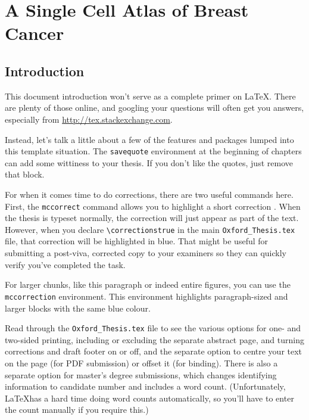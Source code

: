 \chapter{\label{ch:4}A Single Cell Atlas of Breast Cancer}

\minitoc

\section{Introduction}

This document introduction won't serve as a complete primer on \LaTeX.  There are plenty of those online, and googling your questions will often get you answers, especially from \url{http://tex.stackexchange.com}.

Instead, let's talk a little about a few of the features and packages lumped into this template situation.  The \verb|savequote| environment at the beginning of chapters can add some wittiness to your thesis.  If you don't like the quotes, just remove that block.

For when it comes time to do corrections, there are two useful commands here.  First, the \verb|mccorrect| command allows you to highlight a short correction .  When the thesis is typeset normally, the correction will just appear as part of the text.  However, when you declare \verb|\correctionstrue| in the main \verb|Oxford_Thesis.tex| file, that correction will be highlighted in blue.  That might be useful for submitting a post-viva, corrected copy to your examiners so they can quickly verify you've completed the task.

\begin{mccorrection}
For larger chunks, like this paragraph or indeed entire figures, you can use the \verb|mccorrection| environment.  This environment highlights paragraph-sized and larger blocks with the same blue colour.
\end{mccorrection}

Read through the \verb|Oxford_Thesis.tex| file to see the various options for one- and two-sided printing, including or excluding the separate abstract page, and turning corrections and draft footer on or off, and the separate option to centre your text on the page (for PDF submission) or offset it (for binding).  There is also a separate option for master's degree submissions, which changes identifying information to candidate number and includes a word count.  (Unfortunately, \LaTeX has a hard time doing word counts automatically, so you'll have to enter the count manually if you require this.)

